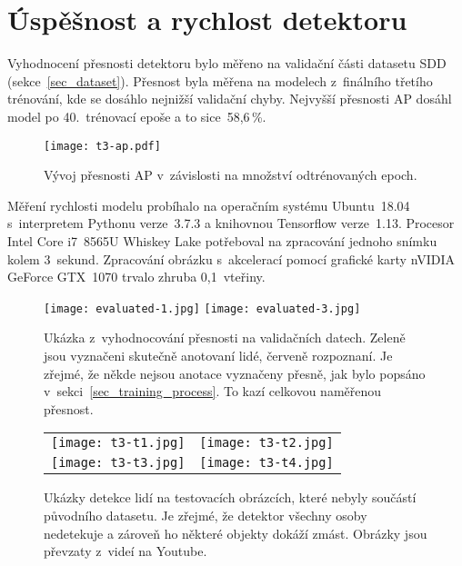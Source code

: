 \pagebreak

\section{Úspěšnost a rychlost detektoru}
\label{sec_detector_results}

Vyhodnocení přesnosti detektoru bylo měřeno na validační části datasetu SDD (sekce~\ref{sec_dataset}). Přesnost byla měřena na modelech z~finálního třetího trénování, kde se dosáhlo nejnižší validační chyby. Nejvyšší přesnosti AP dosáhl model po 40.~trénovací epoše a to sice~58,6\,\%.

\begin{figure}[H]
    \centering
    \texttt{[image: t3-ap.pdf]}
    \caption[Přesnost natrénovaného modelu]{Vývoj přesnosti AP v~závislosti na množství odtrénovaných epoch.}
\end{figure}

Měření rychlosti modelu probíhalo na operačním systému Ubuntu~18.04 s~interpretem Pythonu verze~3.7.3 a knihovnou Tensorflow verze~1.13. Procesor Intel Core i7~8565U Whiskey Lake potřeboval na zpracování jednoho snímku kolem 3~sekund. Zpracování obrázku s~akcelerací pomocí grafické karty nVIDIA GeForce GTX~1070 trvalo zhruba 0,1~vteřiny.

\begin{figure}[H]
    \centering
    \texttt{[image: evaluated-1.jpg]}\hfill
    \texttt{[image: evaluated-3.jpg]}
    \caption[Ukázka z~vyhodnocování přesnosti modelu]{Ukázka z~vyhodnocování přesnosti na validačních datech. Zeleně jsou vyznačeni skutečně anotovaní lidé, červeně rozpoznaní. Je zřejmé, že někde nejsou anotace vyznačeny přesně, jak bylo popsáno v~sekci~\ref{sec_training_process}. To kazí celkovou naměřenou přesnost.}
\end{figure}

\begin{figure}[H]
    \begin{tabular}{cc}
        \texttt{[image: t3-t1.jpg]} &
        \texttt{[image: t3-t2.jpg]} \\
        \texttt{[image: t3-t3.jpg]} &
        \texttt{[image: t3-t4.jpg]} \\
    \end{tabular}
    \caption[Ukázky detekce lidí na testovacích obrázcích]{Ukázky detekce lidí na testovacích obrázcích, které nebyly součástí původního datasetu. Je zřejmé, že detektor všechny osoby nedetekuje a zároveň ho některé objekty dokáží zmást. Obrázky jsou převzaty z~videí na Youtube.\protect\footnotemark}
\end{figure}

